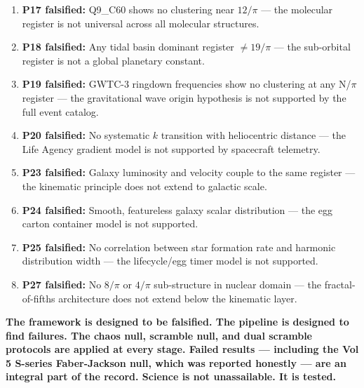 \documentclass[12pt, letterpaper]{article}
\begin{document}
\begin{enumerate}
\item \textbf{P17 falsified:} Q9\_C60 shows no clustering near $12/\pi$
  --- the molecular register is not universal across all molecular structures.

\item \textbf{P18 falsified:} Any tidal basin dominant register $\neq 19/\pi$
  --- the sub-orbital register is not a global planetary constant.

\item \textbf{P19 falsified:} GWTC-3 ringdown frequencies show no clustering
  at any N/$\pi$ register --- the gravitational wave origin hypothesis is
  not supported by the full event catalog.

\item \textbf{P20 falsified:} No systematic $k$ transition with heliocentric
  distance --- the Life Agency gradient model is not supported by spacecraft
  telemetry.

\item \textbf{P23 falsified:} Galaxy luminosity and velocity couple to the
  same register --- the kinematic principle does not extend to galactic scale.

\item \textbf{P24 falsified:} Smooth, featureless galaxy scalar distribution
  --- the egg carton container model is not supported.

\item \textbf{P25 falsified:} No correlation between star formation rate and
  harmonic distribution width --- the lifecycle/egg timer model is not
  supported.

\item \textbf{P27 falsified:} No $8/\pi$ or $4/\pi$ sub-structure in nuclear
  domain --- the fractal-of-fifths architecture does not extend below the
  kinematic layer.
\end{enumerate}

\medskip
\textbf{The framework is designed to be falsified. The pipeline is designed
to find failures. The chaos null, scramble null, and dual scramble protocols
are applied at every stage. Failed results --- including the Vol 5 S-series
Faber-Jackson null, which was reported honestly --- are an integral part of
the record. Science is not unassailable. It is tested.}

\newpage

\appendix
\end{document}
